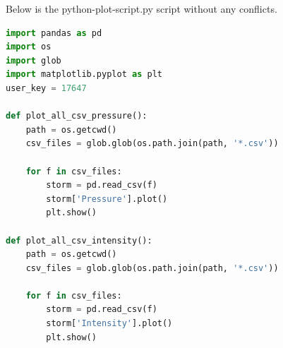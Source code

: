 \documentclass[]{article}
\begin{document}
Below is the python-plot-script.py script without any conflicts.

\begin{lstlisting}[language=python,breaklines=true]
import pandas as pd
import os
import glob
import matplotlib.pyplot as plt
user_key = 17647

def plot_all_csv_pressure():
    path = os.getcwd()
    csv_files = glob.glob(os.path.join(path, '*.csv'))
    
    for f in csv_files:
        storm = pd.read_csv(f)
        storm['Pressure'].plot()
        plt.show()
		
def plot_all_csv_intensity():
    path = os.getcwd()
    csv_files = glob.glob(os.path.join(path, '*.csv'))
    
    for f in csv_files:
        storm = pd.read_csv(f)
        storm['Intensity'].plot()
        plt.show()
\end{lstlisting}
\end{document}
